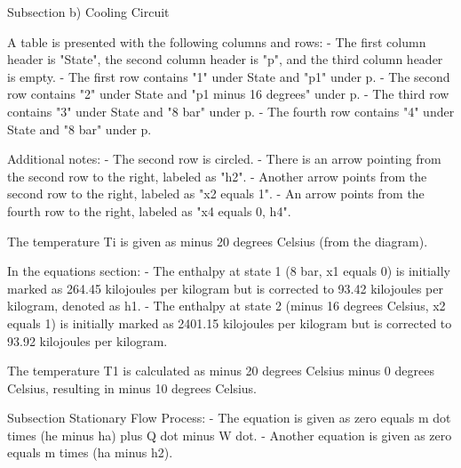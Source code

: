 Subsection b) Cooling Circuit

A table is presented with the following columns and rows:
- The first column header is "State", the second column header is "p", and the third column header is empty.
- The first row contains "1" under State and "p1" under p.
- The second row contains "2" under State and "p1 minus 16 degrees" under p.
- The third row contains "3" under State and "8 bar" under p.
- The fourth row contains "4" under State and "8 bar" under p.

Additional notes:
- The second row is circled.
- There is an arrow pointing from the second row to the right, labeled as "h2".
- Another arrow points from the second row to the right, labeled as "x2 equals 1".
- An arrow points from the fourth row to the right, labeled as "x4 equals 0, h4".

The temperature Ti is given as minus 20 degrees Celsius (from the diagram).

In the equations section:
- The enthalpy at state 1 (8 bar, x1 equals 0) is initially marked as 264.45 kilojoules per kilogram but is corrected to 93.42 kilojoules per kilogram, denoted as h1.
- The enthalpy at state 2 (minus 16 degrees Celsius, x2 equals 1) is initially marked as 2401.15 kilojoules per kilogram but is corrected to 93.92 kilojoules per kilogram.

The temperature T1 is calculated as minus 20 degrees Celsius minus 0 degrees Celsius, resulting in minus 10 degrees Celsius.

Subsection Stationary Flow Process:
- The equation is given as zero equals m dot times (he minus ha) plus Q dot minus W dot.
- Another equation is given as zero equals m times (ha minus h2).